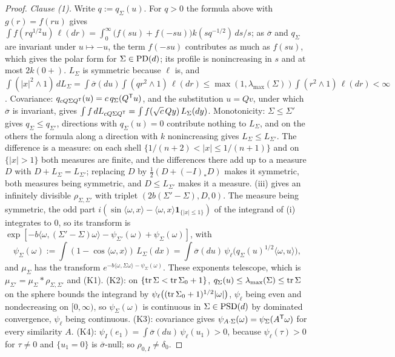\begin{proof}
\emph{Clause (1).} Write $q := q_\Sigma(u)$. For $q > 0$ the formula above with $g(r) = f(ru)$ gives
$\int f(rq^{1/2}u)\,\ell(dr) = \int_0^\infty\bigl(f(su) + f(-su)\bigr)k(sq^{-1/2})\,ds/s$; as $\overline\sigma$ and $q_\Sigma$ are
invariant under $u \mapsto -u$, the term $f(-su)$ contributes as much as $f(su)$, which gives the polar form for
$\Sigma \in \mathrm{PD}(d)$; its profile is nonincreasing in $s$ and at most $2k(0{+})$. $L_\Sigma$ is symmetric because $\ell$
is, and $\int(|x|^2 \wedge 1)\,dL_\Sigma = \int\overline\sigma(du)\int(qr^2 \wedge 1)\,\ell(dr) \le
\max(1,\lambda_{\max}(\Sigma))\int(r^2 \wedge 1)\,\ell(dr) < \infty$. Covariance: $q_{cQ\Sigma Q^{\mathsf{T}}}(u) = c\,q_\Sigma(Q^{\mathsf{T}}u)$, and
the substitution $u = Qv$, under which $\overline\sigma$ is invariant, gives
$\int f\,dL_{cQ\Sigma Q^{\mathsf{T}}} = \int f(\sqrt c\,Qy)\,L_\Sigma(dy)$. Monotonicity: $\Sigma \le \Sigma'$ gives $q_\Sigma \le q_{\Sigma'}$,
directions with $q_\Sigma(u) = 0$ contribute nothing to $L_\Sigma$, and on the others the formula along a direction
with $k$ nonincreasing gives $L_\Sigma \le L_{\Sigma'}$. The difference is a measure: on each shell
$\{1/(n+2) < |x| \le 1/(n+1)\}$ and on $\{|x| > 1\}$ both measures are finite, and the differences there add up
to a measure $D$ with $D + L_\Sigma = L_{\Sigma'}$; replacing $D$ by $\tfrac12(D + (-I)_*D)$ makes it symmetric, both
measures being symmetric, and $D \le L_{\Sigma'}$ makes it a \Levy{} measure. (iii) gives an infinitely
divisible $\rho_{\Sigma,\Sigma'}$ with triplet $(2b(\Sigma' - \Sigma), D, 0)$. The \Levy{} measure being symmetric, the odd
part $i(\sin\langle\omega,x\rangle - \langle\omega,x\rangle\mathbf 1_{\{|x| \le 1\}})$ of the integrand of (i)
integrates to $0$, so its transform is $\exp[-b\langle\omega,(\Sigma' - \Sigma)\omega\rangle - \psi_{\Sigma'}(\omega) +
\psi_\Sigma(\omega)]$, with
\[
  \psi_\Sigma(\omega) := \int(1 - \cos\langle\omega,x\rangle)\,L_\Sigma(dx) = \int\overline\sigma(du)\,\psi_\ell\bigl(q_\Sigma(u)^{1/2}\langle\omega,u\rangle\bigr),
\]
and $\mu_\Sigma$ has the transform $e^{-b\langle\omega,\Sigma\omega\rangle - \psi_\Sigma(\omega)}$. These exponents telescope, which
is $\mu_{\Sigma'} = \mu_\Sigma * \rho_{\Sigma,\Sigma'}$ and (K1). (K2): on $\{\operatorname{tr}\Sigma < \operatorname{tr}\Sigma_0 + 1\}$,
$q_\Sigma(u) \le \lambda_{\max}(\Sigma) \le \operatorname{tr}\Sigma$ on the sphere bounds the integrand by
$\psi_\ell\bigl((\operatorname{tr}\Sigma_0 + 1)^{1/2}|\omega|\bigr)$, $\psi_\ell$ being even and nondecreasing on $[0,\infty)$, so
$\psi_\Sigma(\omega)$ is continuous in $\Sigma \in \mathrm{PSD}(d)$ by dominated convergence, $\psi_\ell$ being continuous. (K3):
covariance gives $\psi_{A\cdot\Sigma}(\omega) = \psi_\Sigma(A^{\mathsf{T}}\omega)$ for every similarity $A$. (K4):
$\psi_I(e_1) = \int\overline\sigma(du)\,\psi_\ell(u_1) > 0$, because $\psi_\ell(\tau) > 0$ for $\tau \ne 0$ and
$\{u_1 = 0\}$ is $\overline\sigma$-null; so $\rho_{0,I} \ne \delta_0$.


\end{proof}
